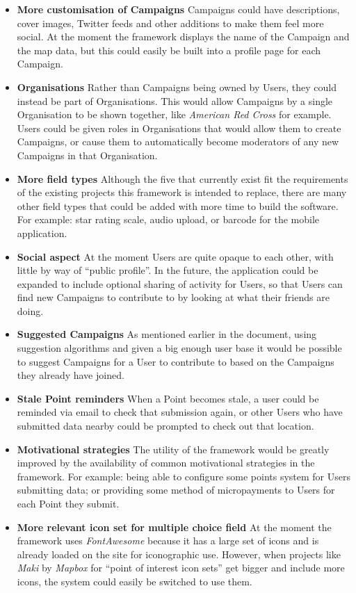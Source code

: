 \documentclass{article}
\newcommand{\pitem}[1]{
	\item{\textbf{#1}}
}
\begin{document}
		\begin{itemize}
			\pitem{More customisation of Campaigns} Campaigns could have descriptions, cover images, Twitter feeds and other additions to make them feel more social. At the moment the framework displays the name of the Campaign and the map data, but this could easily be built into a profile page for each Campaign.
			\pitem{Organisations} Rather than Campaigns being owned by Users, they could instead be part of Organisations. This would allow Campaigns by a single Organisation to be shown together, like \emph{American Red Cross} for example. Users could be given roles in Organisations that would allow them to create Campaigns, or cause them to automatically become moderators of any new Campaigns in that Organisation.
			\pitem{More field types} Although the five that currently exist fit the requirements of the existing projects this framework is intended to replace, there are many other field types that could be added with more time to build the software. For example: star rating scale, audio upload, or barcode for the mobile application.
			\pitem{Social aspect} At the moment Users are quite opaque to each other, with little by way of ``public profile''. In the future, the application could be expanded to include optional sharing of activity for Users, so that Users can find new Campaigns to contribute to by looking at what their friends are doing.
			\pitem{Suggested Campaigns} As mentioned earlier in the document, using suggestion algorithms and given a big enough user base it would be possible to suggest Campaigns for a User to contribute to based on the Campaigns they already have joined.
			\pitem{Stale Point reminders} When a Point becomes stale, a user could be reminded via email to check that submission again, or other Users who have submitted data nearby could be prompted to check out that location.
			\pitem{Motivational strategies} The utility of the framework would be greatly improved by the availability of common motivational strategies in the framework. For example: being able to configure some points system for Users submitting data; or providing some method of micropayments to Users for each Point they submit.
			\pitem{More relevant icon set for multiple choice field} At the moment the framework uses \emph{FontAwesome} because it has a large set of icons and is already loaded on the site for iconographic use. However, when projects like \emph{Maki} by \emph{Mapbox} for ``point of interest icon sets'' get bigger and include more icons, the system could easily be switched to use them.
		\end{itemize}
\end{document}
